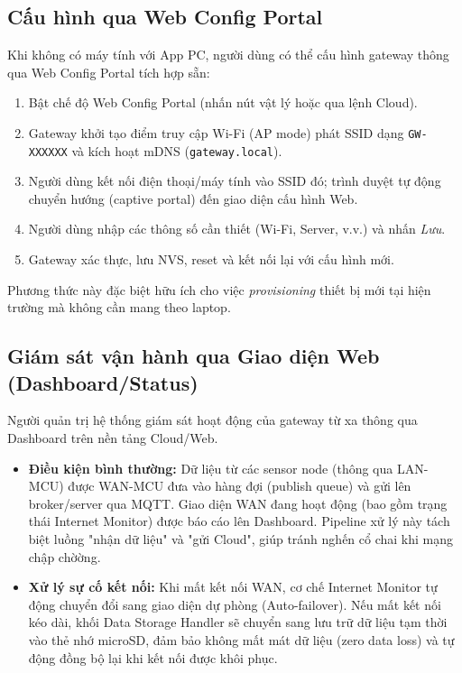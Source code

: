     \subsection{Cấu hình qua Web Config Portal}
    Khi không có máy tính với App PC, người dùng có thể cấu hình gateway thông qua Web Config Portal tích hợp sẵn:
    \begin{enumerate}
        \item Bật chế độ Web Config Portal (nhấn nút vật lý hoặc qua lệnh Cloud).
        \item Gateway khởi tạo điểm truy cập Wi-Fi (AP mode) phát SSID dạng \texttt{GW-XXXXXX} và kích hoạt mDNS (\texttt{gateway.local}).
        \item Người dùng kết nối điện thoại/máy tính vào SSID đó; trình duyệt tự động chuyển hướng (captive portal) đến giao diện cấu hình Web.
        \item Người dùng nhập các thông số cần thiết (Wi-Fi, Server, v.v.) và nhấn \textit{Lưu}.
        \item Gateway xác thực, lưu NVS, reset và kết nối lại với cấu hình mới.
    \end{enumerate}
    Phương thức này đặc biệt hữu ích cho việc \textit{provisioning} thiết bị mới tại hiện trường mà không cần mang theo laptop.


    \subsection{Giám sát vận hành qua Giao diện Web (Dashboard/Status)}
    Người quản trị hệ thống giám sát hoạt động của gateway từ xa thông qua Dashboard trên nền tảng Cloud/Web.

    \begin{itemize}
        \item \textbf{Điều kiện bình thường:} Dữ liệu từ các sensor node (thông qua LAN-MCU) được WAN-MCU đưa vào hàng đợi (publish queue) và gửi lên broker/server qua MQTT. Giao diện WAN đang hoạt động (bao gồm trạng thái Internet Monitor) được báo cáo lên Dashboard. Pipeline xử lý này tách biệt luồng "nhận dữ liệu" và "gửi Cloud", giúp tránh nghến cổ chai khi mạng chập chờờng.
        \item \textbf{Xử lý sự cố kết nối:} Khi mất kết nối WAN, cơ chế Internet Monitor tự động chuyển đổi sang giao diện dự phòng (Auto-failover). Nếu mất kết nối kéo dài, khối Data Storage Handler sẽ chuyển sang lưu trữ dữ liệu tạm thời vào thẻ nhớ microSD, đảm bảo không mất mát dữ liệu (zero data loss) và tự động đồng bộ lại khi kết nối được khôi phục.
    \end{itemize}

